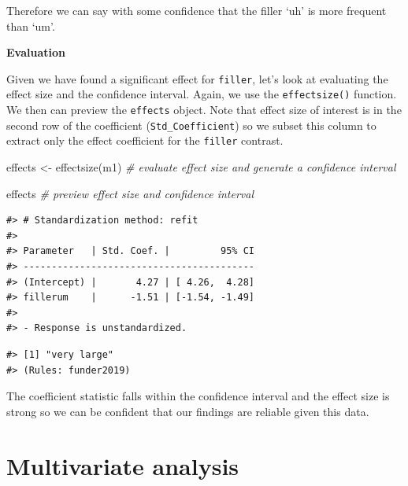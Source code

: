 \documentclass[
  letterpaper,
]{scrbook}
\newenvironment{Shaded}{\begin{snugshade}}{\end{snugshade}}
\newcommand{\CommentTok}[1]{\textcolor[rgb]{0.00,0.00,0.00}{\textit{#1}}}
\newcommand{\DecValTok}[1]{\textcolor[rgb]{0.00,0.00,0.00}{#1}}
\newcommand{\FunctionTok}[1]{\textcolor[rgb]{0.00,0.00,0.00}{#1}}
\newcommand{\NormalTok}[1]{\textcolor[rgb]{0.00,0.00,0.00}{#1}}
\newcommand{\OtherTok}[1]{\textcolor[rgb]{0.00,0.00,0.00}{#1}}
\newcommand{\SpecialCharTok}[1]{\textcolor[rgb]{0.00,0.00,0.00}{#1}}
\begin{document}
Therefore we can say with some confidence that the filler `uh' is more
frequent than `um'.

\textbf{Evaluation}

Given we have found a significant effect for \texttt{filler}, let's look
at evaluating the effect size and the confidence interval. Again, we use
the \texttt{effectsize()} function. We then can preview the
\texttt{effects} object. Note that effect size of interest is in the
second row of the coefficient (\texttt{Std\_Coefficient}) so we subset
this column to extract only the effect coefficient for the
\texttt{filler} contrast.

\begin{Shaded}
\begin{Highlighting}[]
\NormalTok{effects }\OtherTok{\textless{}{-}} \FunctionTok{effectsize}\NormalTok{(m1) }\CommentTok{\# evaluate effect size and generate a confidence interval}

\NormalTok{effects }\CommentTok{\# preview effect size and confidence interval}
\end{Highlighting}
\end{Shaded}

\begin{verbatim}
#> # Standardization method: refit
#> 
#> Parameter   | Std. Coef. |         95% CI
#> -----------------------------------------
#> (Intercept) |       4.27 | [ 4.26,  4.28]
#> fillerum    |      -1.51 | [-1.54, -1.49]
#> 
#> - Response is unstandardized.
\end{verbatim}

\begin{Shaded}
\end{Shaded}

\begin{verbatim}
#> [1] "very large"
#> (Rules: funder2019)
\end{verbatim}

The coefficient statistic falls within the confidence interval and the
effect size is strong so we can be confident that our findings are
reliable given this data.

\hypertarget{multivariate-analysis}{%
\section{Multivariate analysis}\label{multivariate-analysis}}
\end{document}
